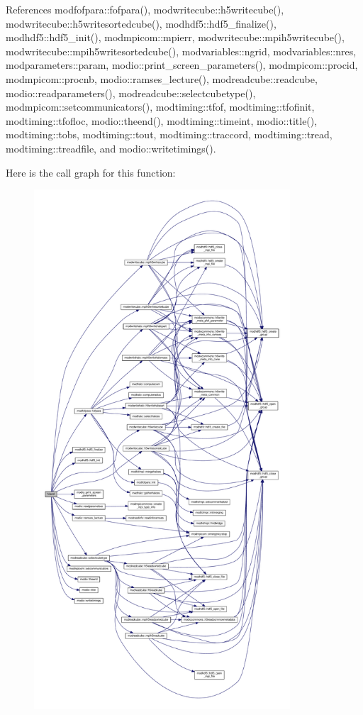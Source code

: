 References modfofpara\+::fofpara(), modwritecube\+::h5writecube(), modwritecube\+::h5writesortedcube(), modhdf5\+::hdf5\+\_\+finalize(), modhdf5\+::hdf5\+\_\+init(), modmpicom\+::mpierr, modwritecube\+::mpih5writecube(), modwritecube\+::mpih5writesortedcube(), modvariables\+::ngrid, modvariables\+::nres, modparameters\+::param, modio\+::print\+\_\+screen\+\_\+parameters(), modmpicom\+::procid, modmpicom\+::procnb, modio\+::ramses\+\_\+lecture(), modreadcube\+::readcube, modio\+::readparameters(), modreadcube\+::selectcubetype(), modmpicom\+::setcommunicators(), modtiming\+::tfof, modtiming\+::tfofinit, modtiming\+::tfofloc, modio\+::theend(), modtiming\+::timeint, modio\+::title(), modtiming\+::tobs, modtiming\+::tout, modtiming\+::traccord, modtiming\+::tread, modtiming\+::treadfile, and modio\+::writetimings().



Here is the call graph for this function\+:\nopagebreak
\begin{figure}[H]
\begin{center}
\leavevmode
\includegraphics[height=550pt]{pfof__snap_8f90_ae44d28f09de4222a58811986e6e2a1d5_cgraph}
\end{center}
\end{figure}



